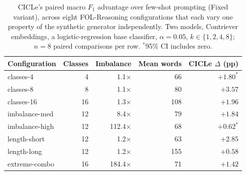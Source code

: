 \documentclass[runningheads]{llncs}
\begin{document}
\begin{table}[h]
\centering
\begin{tabular}{|l|r|r|r|r|}
\hline
Configuration & Classes & Imbalance & Mean words & CICLe $\Delta$ (pp) \\
\hline
classes-4        & 4  & 1.1$\times$   & 66  & $+1.80^{*}$ \\
classes-8        & 8  & 1.1$\times$   & 80  & $+3.57$ \\
classes-16       & 16 & 1.3$\times$   & 108 & $+1.96$ \\
imbalance-med    & 12 & 8.4$\times$   & 79  & $+1.84$ \\
imbalance-high   & 12 & 112.4$\times$ & 68  & $+0.62^{*}$ \\
length-short     & 12 & 1.2$\times$   & 63  & $+2.85$ \\
length-long      & 12 & 1.2$\times$   & 155 & $+0.58$ \\
extreme-combo    & 16 & 184.4$\times$ & 71  & $+1.42$ \\
\hline
\end{tabular}
\smallskip
\caption{CICLe's paired macro $F_1$ advantage over few-shot prompting
(Fixed variant), across eight FOL-Reasoning configurations that each
vary one property of the synthetic generator independently. Two models,
Contriever embeddings, a logistic-regression base classifier,
$\alpha{=}0.05$, $k\in\{1,2,4,8\}$; $n{=}8$ paired comparisons per row.
$^{*}$95\% CI includes zero.}
\label{tab:fol-ablation}
\end{table}
\end{document}
